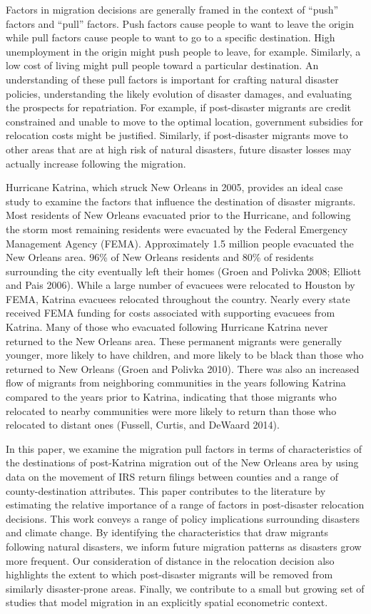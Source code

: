 \documentclass[]{article}
\begin{document}
Factors in migration decisions are generally framed in the context of
``push'' factors and ``pull'' factors. Push factors cause people to want
to leave the origin while pull factors cause people to want to go to a
specific destination. High unemployment in the origin might push people
to leave, for example. Similarly, a low cost of living might pull people
toward a particular destination. An understanding of these pull factors
is important for crafting natural disaster policies, understanding the
likely evolution of disaster damages, and evaluating the prospects for
repatriation. For example, if post-disaster migrants are credit
constrained and unable to move to the optimal location, government
subsidies for relocation costs might be justified. Similarly, if
post-disaster migrants move to other areas that are at high risk of
natural disasters, future disaster losses may actually increase
following the migration.

Hurricane Katrina, which struck New Orleans in 2005, provides an ideal
case study to examine the factors that influence the destination of
disaster migrants. Most residents of New Orleans evacuated prior to the
Hurricane, and following the storm most remaining residents were
evacuated by the Federal Emergency Management Agency (FEMA).
Approximately 1.5 million people evacuated the New Orleans area. 96\% of
New Orleans residents and 80\% of residents surrounding the city
eventually left their homes (Groen and Polivka 2008; Elliott and Pais
2006). While a large number of evacuees were relocated to Houston by
FEMA, Katrina evacuees relocated throughout the country. Nearly every
state received FEMA funding for costs associated with supporting
evacuees from Katrina. Many of those who evacuated following Hurricane
Katrina never returned to the New Orleans area. These permanent migrants
were generally younger, more likely to have children, and more likely to
be black than those who returned to New Orleans (Groen and Polivka
2010). There was also an increased flow of migrants from neighboring
communities in the years following Katrina compared to the years prior
to Katrina, indicating that those migrants who relocated to nearby
communities were more likely to return than those who relocated to
distant ones (Fussell, Curtis, and DeWaard 2014).

In this paper, we examine the migration pull factors in terms of
characteristics of the destinations of post-Katrina migration out of the
New Orleans area by using data on the movement of IRS return filings
between counties and a range of county-destination attributes. This
paper contributes to the literature by estimating the relative
importance of a range of factors in post-disaster relocation decisions.
This work conveys a range of policy implications surrounding disasters
and climate change. By identifying the characteristics that draw
migrants following natural disasters, we inform future migration
patterns as disasters grow more frequent. Our consideration of distance
in the relocation decision also highlights the extent to which
post-disaster migrants will be removed from similarly disaster-prone
areas. Finally, we contribute to a small but growing set of studies that
model migration in an explicitly spatial econometric context.
\end{document}
